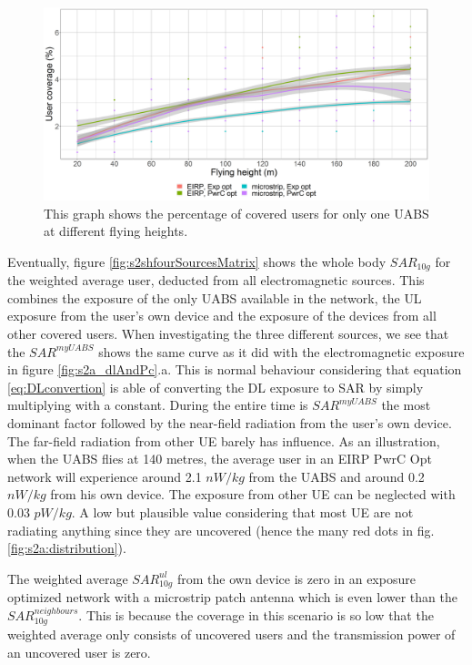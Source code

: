 \begin{figure}[h]
  \includegraphics[width=\textwidth]{../results/s2/fhvscov.png}
  \caption{This graph shows the percentage of covered users for only one \acs{UABS} at different flying heights.}
  \label{fig:s2fhvscov}
\end{figure}

Eventually, figure \ref{fig:s2shfourSourcesMatrix} shows the whole body $SAR_{10g}$ for the weighted average user, deducted from all electromagnetic sources. 
This combines the exposure 
of the only \gls{UABS} available in the network, 
the \gls{UL} exposure from the user’s own device and the exposure of the devices from all other covered users. 
When investigating the three different sources, we see 
that the $SAR^{myUABS}$ shows the same curve as it did with the electromagnetic exposure 
in figure \ref{fig:s2a_dlAndPc}.a. This is normal behaviour considering that equation \ref{eq:DLconvertion} is able of 
converting the \gls{DL} exposure to \gls{SAR} by simply multiplying with a constant.
During the entire time is $SAR^{myUABS}$ the most dominant factor followed by 
 the near-field radiation from the user's own device.
The far-field radiation from other \gls{UE} barely has influence. 
As an illustration, when the \gls{UABS} flies at 140 metres, the average user in an \gls{EIRP} \gls{PwrC Opt} network will 
experience around  2.1 $nW/kg$ from the \gls{UABS} and around 0.2 $nW/kg$ from his own device.
The exposure from other \gls{UE} can be neglected with 0.03 $pW/kg$. A low but plausible value considering that most 
\gls{UE} are not radiating anything since they are uncovered (hence the many red dots in fig. \ref{fig:s2a:distribution}).

The weighted average $SAR^{ul}_{10g}$ from the own device is zero in an exposure optimized network with a microstrip patch antenna 
which is even lower than the $SAR^{neighbours}_{10g}$.
This is because the coverage in this scenario is so low that the weighted average 
only consists of uncovered users and the transmission power of an uncovered user is zero.

